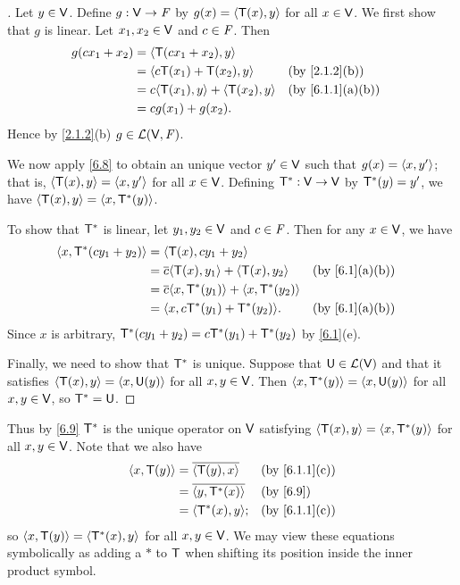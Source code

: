 \begin{proof}[]
  Let \(y \in \mathsf{V}\).
  Define \(g : \mathsf{V} \to \mathit{F}\) by \(g(x) = \left\langle\mathsf{T}(x), y\right\rangle\) for all \(x \in \mathsf{V}\).
  We first show that \(g\) is linear.
  Let \(x_1, x_2 \in \mathsf{V}\) and \(c \in \mathit{F}\).
  Then
  \begin{align*}
    g(c x_1 + x_2) & = \inn{\T(c x_1 + x_2), y}                                   \\
                   & = \inn{c \T(x_1) + \T(x_2), y}          &  & \by{2.1.2}[b]   \\
                   & = c \inn{\T(x_1), y} + \inn{\T(x_2), y} &  & \by{6.1.1}[a,b] \\
                   & = c g(x_1) + g(x_2).
  \end{align*}
  Hence by \cref{2.1.2}(b) \(g \in \mathcal{L}(\mathsf{V}, \mathit{F})\).

  We now apply \cref{6.8} to obtain an unique vector \(y' \in \mathsf{V}\) such that \(g(x) = \left\langle x, y'\right\rangle\);
  that is, \(\left\langle\mathsf{T}(x), y\right\rangle = \left\langle x, y'\right\rangle\) for all \(x \in \mathsf{V}\).
  Defining \(\mathsf{T}^* : \mathsf{V} \to \mathsf{V}\) by \(\mathsf{T}^*(y) = y'\), we have \(\left\langle\mathsf{T}(x), y\right\rangle = \left\langle x, \mathsf{T}^*(y)\right\rangle\).

  To show that \(\mathsf{T}^*\) is linear, let \(y_1, y_2 \in \mathsf{V}\) and \(c \in \mathit{F}\).
  Then for any \(x \in \mathsf{V}\),
  we have
  \begin{align*}
    \inn{x, \T^*(c y_1 + y_2)} & = \inn{\T(x), c y_1 + y_2}                                            \\
                               & = \conj{c} \inn{\T(x), y_1} + \inn{\T(x), y_2}     &  & \by{6.1}[a,b] \\
                               & = \conj{c} \inn{x, \T^*(y_1)} + \inn{x, \T^*(y_2)}                    \\
                               & = \inn{x, c \T^*(y_1) + \T^*(y_2)}.                &  & \by{6.1}[a,b]
  \end{align*}
  Since \(x\) is arbitrary, \(\mathsf{T}^*(c y_1 + y_2) = c \mathsf{T}^*(y_1) + \mathsf{T}^*(y_2)\) by \cref{6.1}(e).

  Finally, we need to show that \(\mathsf{T}^*\) is unique. Suppose that \(\mathsf{U} \in \mathcal{L}(\mathsf{V})\) and that it satisfies \(\left\langle\mathsf{T}(x), y\right\rangle = \left\langle x, \mathsf{U}(y)\right\rangle\) for all \(x, y \in \mathsf{V}\).
  Then \(\left\langle x, \mathsf{T}^*(y)\right\rangle = \left\langle x, \mathsf{U}(y)\right\rangle\) for all \(x, y \in \mathsf{V}\), so \(\mathsf{T}^* = \mathsf{U}\).
\end{proof}

\begin{note}
  Thus by \cref{6.9} \(\mathsf{T}^*\) is the unique operator on \(\mathsf{V}\) satisfying \(\left\langle\mathsf{T}(x), y\right\rangle = \left\langle x, \mathsf{T}^*(y)\right\rangle\) for all \(x, y \in \mathsf{V}\).
  Note that we also have
  \begin{align*}
    \inn{x, \T(y)} & = \conj{\inn{\T(y), x}}   &  & \by{6.1.1}[c] \\
                   & = \conj{\inn{y, \T^*(x)}} &  & \by{6.9}      \\
                   & = \inn{\T^*(x), y};       &  & \by{6.1.1}[c]
  \end{align*}
  so \(\left\langle x, \mathsf{T}(y)\right\rangle = \left\langle\mathsf{T}^*(x), y\right\rangle\) for all \(x, y \in \mathsf{V}\).
  We may view these equations symbolically as adding a \(*\) to \(\mathsf{T}\) when shifting its position inside the inner product symbol.
\end{note}

